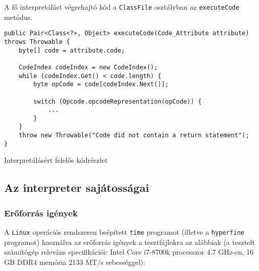 A fő interpretálást végrehajtó kód a \lstinline{ClassFile} osztályban az \lstinline{executeCode} metódus.

\begin{listing}[H]
\begin{verbatim}
public Pair<Class<?>, Object> executeCode(Code_Attribute attribute) throws Throwable {
	byte[] code = attribute.code;

	CodeIndex codeIndex = new CodeIndex();
	while (codeIndex.Get() < code.length) {
		byte opCode = code[codeIndex.Next()];

		switch (Opcode.opcodeRepresentation(opCode)) {
			...
		}
	}
	throw new Throwable("Code did not contain a return statement");
}
\end{verbatim}
\caption{Interpretálásért felelős kódrészlet}
\end{listing}

\subsection{Az interpreter sajátosságai}

\subsubsection{Erőforrás igények}

A \lstinline{Linux} operációs rendszeren beépített \lstinline{time} programot (illetve a \lstinline{hyperfine} programot) használva az erőforrás igények a tesztfájlokra az alábbiak (a tesztelt számítógép releváns specifikációi: Intel Core i7-8700k processzor 4.7 GHz-en, 16 GB DDR4 memória 2133 MT/s sebességgel):

